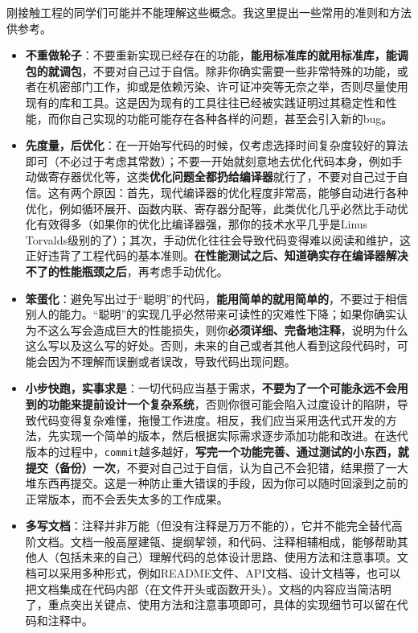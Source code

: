 刚接触工程的同学们可能并不能理解这些概念。我这里提出一些常用的准则和方法供参考。
\begin{itemize}
  \item \textbf{不重做轮子}：不要重新实现已经存在的功能，\textbf{能用标准库的就用标准库，能调包的就调包}，不要对自己过于自信。除非你确实需要一些非常特殊的功能，或者在机密部门工作，抑或是依赖污染、许可证冲突等无奈之举，否则尽量使用现有的库和工具。这是因为现有的工具往往已经被实践证明过其稳定性和性能，而你自己实现的功能可能存在各种各样的问题，甚至会引入新的bug。
  \item \textbf{先度量，后优化}：在一开始写代码的时候，仅考虑选择时间复杂度较好的算法即可（不必过于考虑其常数）；不要一开始就刻意地去优化代码本身，例如手动做寄存器优化等，这类\textbf{优化问题全都扔给编译器}就行了，不要对自己过于自信。这有两个原因：首先，现代编译器的优化程度非常高，能够自动进行各种优化，例如循环展开、函数内联、寄存器分配等，此类优化几乎必然比手动优化有效得多（如果你的优化比编译器强，那你的技术水平几乎是Linus Torvalds级别的了）；其次，手动优化往往会导致代码变得难以阅读和维护，这正好违背了工程代码的基本准则。\textbf{在性能测试之后、知道确实存在编译器解决不了的性能瓶颈之后}，再考虑手动优化。
  \item \textbf{笨蛋化}：避免写出过于“聪明”的代码，\textbf{能用简单的就用简单的}，不要过于相信别人的能力。“聪明”的实现几乎必然带来可读性的灾难性下降；如果你确实认为不这么写会造成巨大的性能损失，则你\textbf{必须详细、完备地注释}，说明为什么这么写以及这么写的好处。否则，未来的自己或者其他人看到这段代码时，可能会因为不理解而误删或者误改，导致代码出现问题。
  \item \textbf{小步快跑，实事求是}：一切代码应当基于需求，\textbf{不要为了一个可能永远不会用到的功能来提前设计一个复杂系统}，否则你很可能会陷入过度设计的陷阱，导致代码变得复杂难懂，拖慢工作进度。相反，我们应当采用迭代式开发的方法，先实现一个简单的版本，然后根据实际需求逐步添加功能和改进。在迭代版本的过程中，\texttt{commit}越多越好，\textbf{写完一个功能完善、通过测试的小东西，就提交（备份）一次}，不要对自己过于自信，认为自己不会犯错，结果攒了一大堆东西再提交。这是一种防止重大错误的手段，因为你可以随时回滚到之前的正常版本，而不会丢失太多的工作成果。
  \item \textbf{多写文档}：注释并非万能（但没有注释是万万不能的），它并不能完全替代高阶文档。文档一般高屋建瓴、提纲挈领，和代码、注释相辅相成，能够帮助其他人（包括未来的自己）理解代码的总体设计思路、使用方法和注意事项。文档可以采用多种形式，例如README文件、API文档、设计文档等，也可以把文档集成在代码内部（在文件开头或函数开头）。文档的内容应当简洁明了，重点突出关键点、使用方法和注意事项即可，具体的实现细节可以留在代码和注释中。
\end{itemize}

